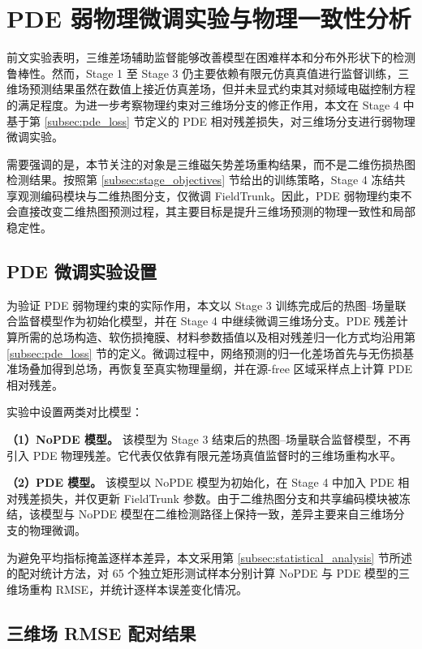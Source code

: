 \section{PDE 弱物理微调实验与物理一致性分析}
\label{sec:pde_implementation}

前文实验表明，三维差场辅助监督能够改善模型在困难样本和分布外形状下的检测鲁棒性。然而，Stage 1 至 Stage 3 仍主要依赖有限元仿真真值进行监督训练，三维场预测结果虽然在数值上接近仿真差场，但并未显式约束其对频域电磁控制方程的满足程度。为进一步考察物理约束对三维场分支的修正作用，本文在 Stage 4 中基于第 \ref{subsec:pde_loss} 节定义的 PDE 相对残差损失，对三维场分支进行弱物理微调实验。

需要强调的是，本节关注的对象是三维磁矢势差场重构结果，而不是二维伤损热图检测结果。按照第 \ref{subsec:stage_objectives} 节给出的训练策略，Stage 4 冻结共享观测编码模块与二维热图分支，仅微调 FieldTrunk。因此，PDE 弱物理约束不会直接改变二维热图预测过程，其主要目标是提升三维场预测的物理一致性和局部稳定性。

\subsection{PDE 微调实验设置}
\label{subsec:pde_finetune_setting}

为验证 PDE 弱物理约束的实际作用，本文以 Stage 3 训练完成后的热图--场量联合监督模型作为初始化模型，并在 Stage 4 中继续微调三维场分支。PDE 残差计算所需的总场构造、软伤损掩膜、材料参数插值以及相对残差归一化方式均沿用第 \ref{subsec:pde_loss} 节的定义。微调过程中，网络预测的归一化差场首先与无伤损基准场叠加得到总场，再恢复至真实物理量纲，并在源-free 区域采样点上计算 PDE 相对残差。

实验中设置两类对比模型：

\textbf{（1）NoPDE 模型。}  
该模型为 Stage 3 结束后的热图--场量联合监督模型，不再引入 PDE 物理残差。它代表仅依靠有限元差场真值监督时的三维场重构水平。

\textbf{（2）PDE 模型。}  
该模型以 NoPDE 模型为初始化，在 Stage 4 中加入 PDE 相对残差损失，并仅更新 FieldTrunk 参数。由于二维热图分支和共享编码模块被冻结，该模型与 NoPDE 模型在二维检测路径上保持一致，差异主要来自三维场分支的物理微调。

为避免平均指标掩盖逐样本差异，本文采用第 \ref{subsec:statistical_analysis} 节所述的配对统计方法，对 65 个独立矩形测试样本分别计算 NoPDE 与 PDE 模型的三维场重构 RMSE，并统计逐样本误差变化情况。

\subsection{三维场 RMSE 配对结果}
\label{subsec:pde_rmse_results}

